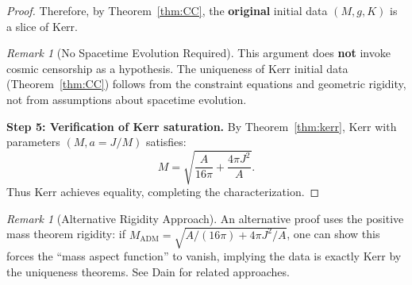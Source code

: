 \documentclass[12pt]{article}
\theoremstyle{plain}
\theoremstyle{definition}
\theoremstyle{remark}
\newtheorem{remark}[theorem]{Remark}
\newcommand{\ADM}{\mathrm{ADM}}
\begin{document}
\begin{proof}
Therefore, by Theorem~\ref{thm:CC}, the \textbf{original} initial data $(M, g, K)$ is a slice of Kerr.

\begin{remark}[No Spacetime Evolution Required]
This argument does \textbf{not} invoke cosmic censorship as a hypothesis. The uniqueness of Kerr initial data (Theorem~\ref{thm:CC}) follows from the constraint equations and geometric rigidity, not from assumptions about spacetime evolution.
\end{remark}

\textbf{Step 5: Verification of Kerr saturation.}
By Theorem~\ref{thm:kerr}, Kerr with parameters $(M, a = J/M)$ satisfies:
\[
M = \sqrt{\frac{A}{16\pi} + \frac{4\pi J^2}{A}}.
\]
Thus Kerr achieves equality, completing the characterization.
\end{proof}

\begin{remark}[Alternative Rigidity Approach]
An alternative proof uses the positive mass theorem rigidity: if $M_{\ADM} = \sqrt{A/(16\pi) + 4\pi J^2/A}$, one can show this forces the ``mass aspect function'' to vanish, implying the data is exactly Kerr by the uniqueness theorems. See Dain \cite{dain2012} for related approaches.
\end{remark}
\end{document}
